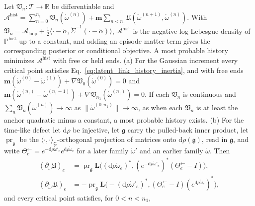 \begin{proposition}\label{prop:llp_inertia}
Let $\mathfrak V_n:\mathcal T\to\mathbb R$ be differentiable and $\mathcal A^{\mathrm{hist}}=\sum_{n=0}^{n_1}\mathfrak V_n(\mathring\omega^{(n)})+\mathbf m\sum_{n<n_1}\mathfrak U(\mathring\omega^{(n+1)},\mathring\omega^{(n)})$. With $\mathfrak V_n=\mathcal A_{\mathrm{loop}}+\frac12\langle\cdot-\mathring\alpha,\mathring\Sigma^{-1}(\cdot-\mathring\alpha)\rangle$, $\mathcal A^{\mathrm{hist}}$ is the negative log Lebesgue density of $\mathbb P^{\mathrm{hist}}$ up to a constant, and adding an episode matter term gives the corresponding posterior or conditional objective. A most probable history minimizes $\mathcal A^{\mathrm{hist}}$ with free or held ends.
(a) For the Gaussian increment every critical point satisfies Eq.~\eqref{eq:latent_link_history_inertia}, and with free ends $\mathbf m(\mathring\omega^{(0)}-\mathring\omega^{(1)})+\nabla\mathfrak V_0(\mathring\omega^{(0)})=0$ and $\mathbf m(\mathring\omega^{(n_1)}-\mathring\omega^{(n_1-1)})+\nabla\mathfrak V_{n_1}(\mathring\omega^{(n_1)})=0$. If each $\mathfrak V_n$ is continuous and $\sum_n\mathfrak V_n(\mathring\omega^{(n)})\to\infty$ as $\|\mathring\omega^{(0:n_1)}\|\to\infty$, as when each $\mathfrak V_n$ is at least the anchor quadratic minus a constant, a most probable history exists.
(b) For the time-like defect let $\mathrm d\rho$ be injective, let $\mathfrak g$ carry the pulled-back inner product, let $\operatorname{pr}_{\mathfrak g}$ be the $\langle\cdot,\cdot\rangle_{\mathsf G}$-orthogonal projection of matrices onto $\mathrm d\rho(\mathfrak g)$, read in $\mathfrak g$, and write $\Theta^{\leftarrow}_e=e^{-\mathrm d\rho\mathring\omega'_e}e^{\mathrm d\rho\mathring\omega_e}$ for a later family $\mathring\omega'$ and an earlier family $\mathring\omega$. Then
\begin{equation}
\begin{aligned}
(\partial_{\mathring\omega}\mathfrak U)_e&=\operatorname{pr}_{\mathfrak g}\mathbf L\bigl((\mathrm d\rho\mathring\omega_e)^*,(e^{-\mathrm d\rho\mathring\omega'_e})^*(\Theta^{\leftarrow}_e-I)\bigr),\\
(\partial_{\mathring\omega'}\mathfrak U)_e&=-\operatorname{pr}_{\mathfrak g}\mathbf L\bigl(-(\mathrm d\rho\mathring\omega'_e)^*,(\Theta^{\leftarrow}_e-I)(e^{\mathrm d\rho\mathring\omega_e})^*\bigr),
\end{aligned}
\label{eq:llp_timelike_gradients}
\end{equation}
and every critical point satisfies, for $0<n<n_1$,

\end{proposition}
